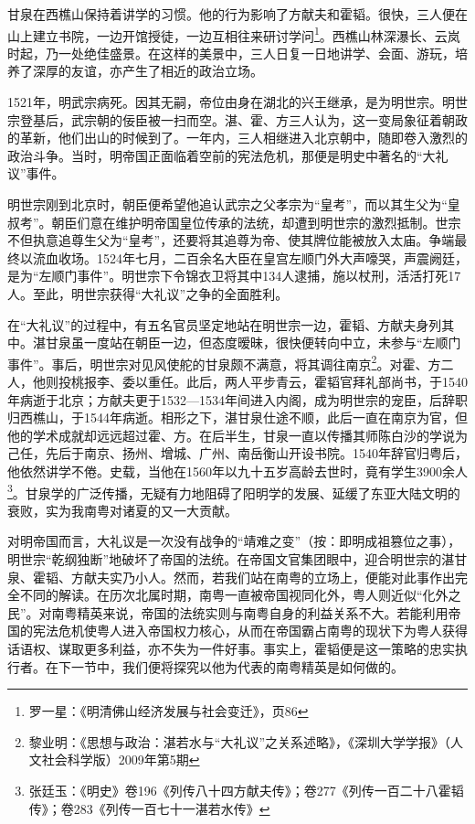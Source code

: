 甘泉在西樵山保持着讲学的习惯。他的行为影响了方献夫和霍韬。很快，三人便在山上建立书院，一边开馆授徒，一边互相往来研讨学问\footnote{罗一星：《明清佛山经济发展与社会变迁》，页86}。西樵山林深瀑长、云岚时起，乃一处绝佳盛景。在这样的美景中，三人日复一日地讲学、会面、游玩，培养了深厚的友谊，亦产生了相近的政治立场。

1521年，明武宗病死。因其无嗣，帝位由身在湖北的兴王继承，是为明世宗。明世宗登基后，武宗朝的佞臣被一扫而空。湛、霍、方三人认为，这一变局象征着朝政的革新，他们出山的时候到了。一年内，三人相继进入北京朝中，随即卷入激烈的政治斗争。当时，明帝国正面临着空前的宪法危机，那便是明史中著名的“大礼议”事件。

明世宗刚到北京时，朝臣便希望他追认武宗之父孝宗为“皇考”，而以其生父为“皇叔考”。朝臣们意在维护明帝国皇位传承的法统，却遭到明世宗的激烈抵制。世宗不但执意追尊生父为“皇考”，还要将其追尊为帝、使其牌位能被放入太庙。争端最终以流血收场。1524年七月，二百余名大臣在皇宫左顺门外大声嚎哭，声震阙廷，是为“左顺门事件”。明世宗下令锦衣卫将其中134人逮捕，施以杖刑，活活打死17人。至此，明世宗获得“大礼议”之争的全面胜利。

在“大礼议”的过程中，有五名官员坚定地站在明世宗一边，霍韬、方献夫身列其中。湛甘泉虽一度站在朝臣一边，但态度暧昧，很快便转向中立，未参与“左顺门事件”。事后，明世宗对见风使舵的甘泉颇不满意，将其调往南京\footnote{黎业明：《思想与政治：湛若水与“大礼议”之关系述略》，《深圳大学学报》（人文社会科学版）2009年第5期}。对霍、方二人，他则投桃报李、委以重任。此后，两人平步青云，霍韬官拜礼部尚书，于1540年病逝于北京；方献夫更于1532—1534年间进入内阁，成为明世宗的宠臣，后辞职归西樵山，于1544年病逝。相形之下，湛甘泉仕途不顺，此后一直在南京为官，但他的学术成就却远远超过霍、方。在后半生，甘泉一直以传播其师陈白沙的学说为己任，先后于南京、扬州、增城、广州、南岳衡山开设书院。1540年辞官归粤后，他依然讲学不倦。史载，当他在1560年以九十五岁高龄去世时，竟有学生3900余人\footnote{张廷玉：《明史》卷196《列传八十四方献夫传》；卷277《列传一百二十八霍韬传》；卷283《列传一百七十一湛若水传》}。甘泉学的广泛传播，无疑有力地阻碍了阳明学的发展、延缓了东亚大陆文明的衰败，实为我南粤对诸夏的又一大贡献。

对明帝国而言，大礼议是一次没有战争的“靖难之变”（按：即明成祖篡位之事），明世宗“乾纲独断”地破坏了帝国的法统。在帝国文官集团眼中，迎合明世宗的湛甘泉、霍韬、方献夫实乃小人。然而，若我们站在南粤的立场上，便能对此事作出完全不同的解读。在历次北属时期，南粤一直被帝国视同化外，粤人则近似“化外之民”。对南粤精英来说，帝国的法统实则与南粤自身的利益关系不大。若能利用帝国的宪法危机使粤人进入帝国权力核心，从而在帝国霸占南粤的现状下为粤人获得话语权、谋取更多利益，亦不失为一件好事。事实上，霍韬便是这一策略的忠实执行者。在下一节中，我们便将探究以他为代表的南粤精英是如何做的。

